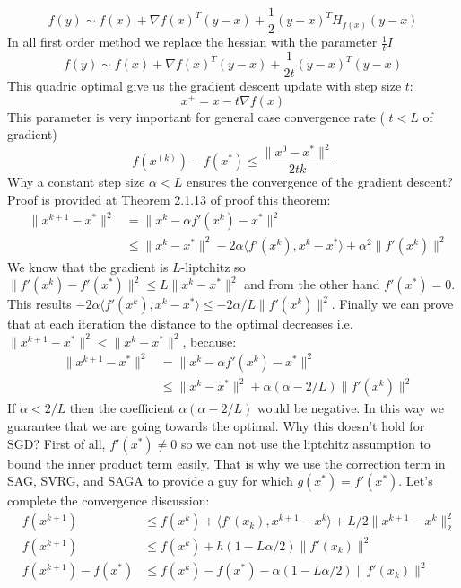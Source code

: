 \documentclass[11pt, a4paper, reqno, twoside]{scrartcl}
\theoremstyle{style}
\newcommand{\0}{\mathbf{0}} %
\begin{document}
\[
  f(y) \sim f(x) + \nabla f(x)^{T}(y-x) + \frac{1}{2}(y-x)^{T} H_{f(x)} (y-x)	
\]
In all first order method we replace the hessian with the parameter
$\frac{1}{t} I $
\[
  f(y) \sim f(x) + \nabla f(x)^{T}(y-x) + \frac{1}{2t}(y-x)^{T}  (y-x)	
\]
This quadric optimal give us the gradient descent update with step size
$t$:
\[
	x^+ = x - t \nabla f(x)
\]
This parameter is very important for general case convergence rate ( $t< L$ of
gradient)
\[ 
  f(x^{(k)}) - f(x^*) \leq  \frac{\| x^0 - x^* \|^2}{2 t k}
\]
Why a constant step size $\alpha < L$ ensures the convergence of
the gradient descent? 
Proof is provided at Theorem 2.1.13 of \cite{nesterov2004introductory} proof
this theorem: 
\begin{eqnarray}
	& \| x^{k+1} - x^* \|^2  & = \| x^{k} - \alpha f'(x^k) - x^*\|^2 \nonumber\\
	& & \leq \| x^{k}  - x^*\|^2 - 2 \alpha \langle f'(x^k), x^k - x^* \rangle +
	\alpha^2 \| f'(x^k) \|^2 \label{eqn:convergence_decomposition}
\end{eqnarray}
We know that the gradient is $L$-liptchitz so $\| f'(x^k) - f'(x^*) \|^2 \leq  L
\| x^k - x^* \|^2$ and from the other hand $f'(x^*) = 0$. This results 
$- 2 \alpha \langle f'(x^k), x^k - x^* \rangle \leq -2 \alpha/L \|f'(x^k) \|^2$.
Finally we can prove that at each iteration the distance to the optimal
decreases i.e.
$\|x^{k+1} - x^*\|^2 < \|x^{k} -x^* \|^2$, because: 
\begin{eqnarray}
	& \| x^{k+1} - x^* \|^2  & = \| x^{k} - \alpha f'(x^k) - x^*\|^2  \nonumber \\
	& & \leq \| x^{k}  - x^*\|^2 +
	\alpha(\alpha - 2/L) \| f'(x^k) \|^2 \nonumber
\end{eqnarray}
If $\alpha <2/L$ then the coefficient $\alpha(\alpha - 2/L)$ would be negative. 
In this way we guarantee that we are going towards the optimal. 
Why this doesn't hold for SGD? First of all, $f'(x^*) \neq 0$ so we can not use 
the liptchitz assumption to bound the inner product term easily. That is why we
use the correction term in SAG, SVRG, and SAGA to provide a guy for which
$g(x^*) = f'(x^*)$. Let's complete the convergence discussion: 
\begin{eqnarray*}
	& f(x^{k+1}) & \leq f(x^k) + \langle f'(x_k), x^{k+1} - x^{k} \rangle
	+ L/2 \| x^{k+1} - x^k\|_2^2 \\ 
	& f(x^{k+1}) & \leq f(x^k) + h(1 - L \alpha/2) \| f'(x_k)\|^2 \\ 
	& f(x^{k+1})  - f(x^*) & \leq f(x^k) - f(x^*) - \alpha(1 - L \alpha/2) \|
	f'(x_k)\|^2
\end{eqnarray*}
\end{document}
